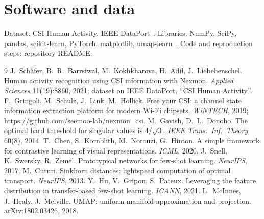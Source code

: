 \documentclass[11pt]{article}
\begin{document}
\section*{Software and data}
Dataset: CSI Human Activity, IEEE DataPort~\cite{schafer}. Libraries: NumPy, SciPy, pandas,
scikit-learn, PyTorch, matplotlib, umap-learn~\cite{umap}. Code and reproduction steps: repository README.

\footnotesize
\begin{thebibliography}{9}\setlength{\itemsep}{0pt}
 J.~Sch\"afer, B.~R.~Barrsiwal, M.~Kokhkharova, H.~Adil, J.~Liebehenschel. Human activity
recognition using CSI information with Nexmon. \emph{Applied Sciences} 11(19):8860, 2021; dataset on
IEEE DataPort, ``CSI Human Activity''.
 F.~Gringoli, M.~Schulz, J.~Link, M.~Hollick. Free your CSI: a channel state information
extraction platform for modern Wi-Fi chipsets. \emph{WiNTECH}, 2019; \url{https://github.com/seemoo-lab/nexmon_csi}.
 M.~Gavish, D.~L.~Donoho. The optimal hard threshold for singular values is $4/\sqrt3$.
\emph{IEEE Trans.\ Inf.\ Theory} 60(8), 2014.
 T.~Chen, S.~Kornblith, M.~Norouzi, G.~Hinton. A simple framework for contrastive learning of
visual representations. \emph{ICML}, 2020.
 J.~Snell, K.~Swersky, R.~Zemel. Prototypical networks for few-shot learning. \emph{NeurIPS}, 2017.
 M.~Cuturi. Sinkhorn distances: lightspeed computation of optimal transport. \emph{NeurIPS}, 2013.
 Y.~Hu, V.~Gripon, S.~Pateux. Leveraging the feature distribution in transfer-based few-shot
learning. \emph{ICANN}, 2021.
 L.~McInnes, J.~Healy, J.~Melville. UMAP: uniform manifold approximation and projection.
arXiv:1802.03426, 2018.
\end{thebibliography}
\end{document}
